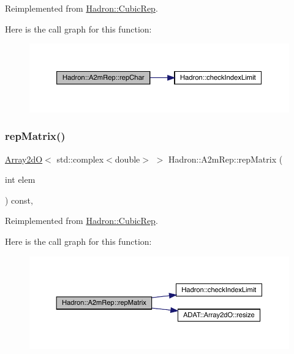 Reimplemented from \mbox{\hyperlink{structHadron_1_1CubicRep_af45227106e8e715e84b0af69cd3b36f8}{Hadron\+::\+Cubic\+Rep}}.

Here is the call graph for this function\+:
\nopagebreak
\begin{figure}[H]
\begin{center}
\leavevmode
\includegraphics[width=350pt]{da/db3/structHadron_1_1A2mRep_a67d04149198c33ca703b1eb5fc0198f8_cgraph}
\end{center}
\end{figure}
\mbox{\label{structHadron_1_1A2mRep_a02575a23902366eafe355b1c36667754}} 
\subsubsection{\texorpdfstring{repMatrix()}{repMatrix()}\hspace{0.1cm}{\footnotesize\ttfamily [1/2]}}
{\footnotesize\ttfamily \mbox{\hyperlink{classADAT_1_1Array2dO}{Array2dO}}$<$ std\+::complex$<$double$>$ $>$ Hadron\+::\+A2m\+Rep\+::rep\+Matrix (\begin{DoxyParamCaption}\item[{int}]{elem }\end{DoxyParamCaption}) const\hspace{0.3cm}{\ttfamily [inline]}, {\ttfamily [virtual]}}



Reimplemented from \mbox{\hyperlink{structHadron_1_1CubicRep_ac5d7e9e6f4ab1158b5fce3e4ad9e8005}{Hadron\+::\+Cubic\+Rep}}.

Here is the call graph for this function\+:
\nopagebreak
\begin{figure}[H]
\begin{center}
\leavevmode
\includegraphics[width=350pt]{da/db3/structHadron_1_1A2mRep_a02575a23902366eafe355b1c36667754_cgraph}
\end{center}
\end{figure}
\mbox{\label{structHadron_1_1A2mRep_a02575a23902366eafe355b1c36667754}} 
